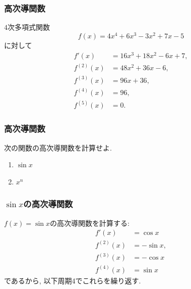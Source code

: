 




\begin{frame}
\frametitle{高次導関数}


$4$次多項式関数
$$
f(x)= 4x^4+6x^3-3x^2+7x-5
$$
に対して
\begin{align*}
f'(x) & = 16x^3+18x^2-6x+7, \\
f^{(2)}(x) & = 48x^2+36x-6, \\
f^{(3)}(x) & = 96x+36, \\
f^{(4)}(x) & = 96, \\
f^{(5)}(x) & = 0. 
\end{align*}


\end{frame}







\begin{frame}
\frametitle{高次導関数}

\begin{Prob}
次の関数の高次導関数を計算せよ. 
\begin{enumerate}
\item $\sin x$
\item $x^n$
\end{enumerate}
\end{Prob}


\end{frame}







\begin{frame}
\frametitle{$\sin x$の高次導関数}


$f(x)=\sin x$の高次導関数を計算する: 
\begin{align*}
f'(x) & = \cos x \\
f^{(2)}(x) & = -\sin x, \\
f^{(3)}(x) & = -\cos x \\
f^{(4)}(x) & =  \sin x
\end{align*}
であるから, 以下周期4でこれらを繰り返す. 
\end{frame}


